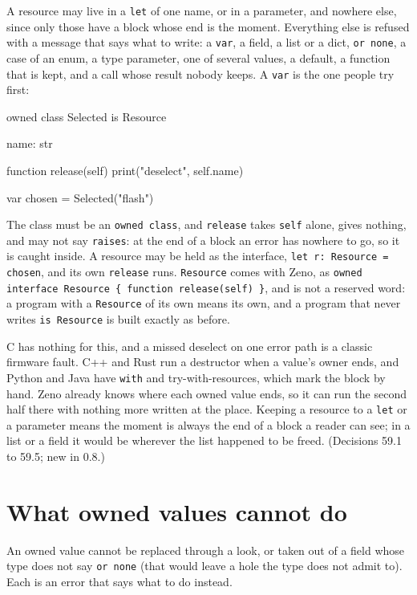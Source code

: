 A resource may live in a \verb|let| of one name, or in a parameter,
and nowhere else, since only those have a block whose end is the
moment. Everything else is refused with a message that says what to
write: a \verb|var|, a field, a list or a dict, \verb|or none|, a case
of an enum, a type parameter, one of several values, a default, a
function that is kept, and a call whose result nobody keeps. A
\verb|var| is the one people try first:

\begin{zeno}[fails=yes]
owned class Selected is Resource {
    name: str

    function release(self) {
        print("deselect", self.name)
    }
}

var chosen = Selected("flash")
\end{zeno}

The class must be an \verb|owned class|, and \verb|release| takes
\verb|self| alone, gives nothing, and may not say \verb|raises|: at the
end of a block an error has nowhere to go, so it is caught inside. A
resource may be held as the interface, \verb|let r: Resource = chosen|,
and its own \verb|release| runs. \verb|Resource| comes with Zeno, as
\verb|owned interface Resource { function release(self) }|, and is not
a reserved word: a program with a \verb|Resource| of its own means its
own, and a program that never writes \verb|is Resource| is built
exactly as before.

\begin{why}
C has nothing for this, and a missed deselect on one error path is a
classic firmware fault. C++ and Rust run a destructor when a value's
owner ends, and Python and Java have \verb|with| and
try-with-resources, which mark the block by hand. Zeno already knows
where each owned value ends, so it can run the second half there with
nothing more written at the place. Keeping a resource to a \verb|let|
or a parameter means the moment is always the end of a block a reader
can see; in a list or a field it would be wherever the list happened
to be freed. (Decisions 59.1 to 59.5; new in 0.8.)
\end{why}

\section{What owned values cannot do}

An owned value cannot be replaced through a look, or taken out of a
field whose type does not say \verb|or none| (that would leave a hole
the type does not admit to). Each is an error that says what to do
instead.

